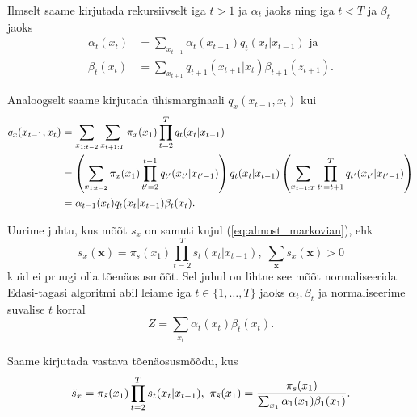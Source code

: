 


Ilmselt saame kirjutada rekursiivselt iga $t > 1$ ja $\alpha_t$ jaoks ning iga $t < T$ ja $\beta_t$ jaoks
\begin{align*}
    \alpha_t(x_{t}) &= \sum_{x_{t-1}} \alpha_t(x_{t-1}) q_t(x_{t} | x_{t-1}) \text{ ja} \\
    \beta_t(x_t) &= \sum_{x_{t+1}} q_{t+1}(x_{t+1} | x_{t})\beta_{t+1}(z_{t+1}).
\end{align*}

Analoogselt saame kirjutada ühismarginaali $q_x(x_{t-1},x_t)$ kui
\begin{align}
    \notag
    q_x(x_{t-1},x_t) &= \sum_{x_{1:t-2}} \sum_{x_{t+1:T}} {\pi_x(x_1) \prod_{t=2}^T q_t(x_t|x_{t-1})}\\
    \notag
    &= \left( \sum_{x_{1:t-2}} {\pi_x(x_1) \prod_{t'=2}^{t-1} q_{t'}(x_{t'}|x_{t'-1})} \right) q_{t}(x_t|x_{t-1}) \left( \sum_{x_{t+1:T}} \prod_{t'=t+1}^T q_{t'}(x_{t'}|x_{t'-1}) \right)\\
    \label{eq:fb2}
    &= \alpha_{t-1}(x_t) q_{t}(x_t|x_{t-1}) \beta_t(x_t).
\end{align}

Uurime juhtu, kus mõõt $s_x$ on samuti kujul (\ref{eq:almost_markovian}), ehk
$$s_x(\bm{x}) = \pi_s(x_1) \prod_{t=2}^T s_t(x_t|x_{t-1}),\; \sum_{\bm{x}}s_x(\bm{x}) > 0$$
kuid ei pruugi olla tõenäosusmõõt. Sel juhul on lihtne see mõõt normaliseerida. Edasi-tagasi algoritmi abil leiame iga $t \in \{1,\ldots,T\}$ jaoks $\alpha_t, \beta_t$ ja normaliseerime suvalise $t$ korral
$$Z = \sum_{x_t} \alpha_t(x_t)\beta_t(x_t).$$

Saame kirjutada vastava tõenäosusmõõdu, kus 
\begin{equation}
    \label{eq:almost_markovian_normalisation}
    \Tilde{s}_x = \pi_{\Tilde{s}}(x_1) \prod_{t=2}^T s_t(x_t|x_{t-1}),\ \pi_{\Tilde{s}}(x_1) = \frac{\pi_{s}(x_1)}{\sum_{x_1}\alpha_1(x_1)\beta_1(x_1)}.
\end{equation}


